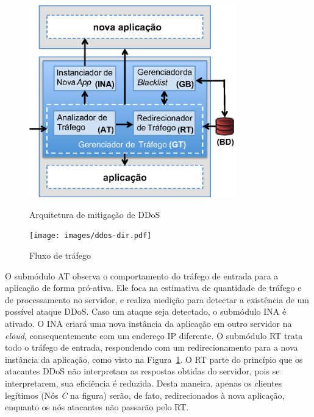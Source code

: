 \begin{figure}[t!]
  \centering
  \begin{minipage}[b]{0.59\linewidth}
    \centering
    \includegraphics[width=0.8\textwidth]{images/arq.eps}
	\caption{Arquitetura de mitigação de DDoS}
	\label{fig:arq}
  \end{minipage}
  \begin{minipage}[b]{0.4\linewidth}
    \centering
    \texttt{[image: images/ddos-dir.pdf]}
	\caption{Fluxo de tráfego}
	\label{fig:traf-ddos}
  \end{minipage}

\end{figure}



O submódulo AT observa o comportamento do tráfego de entrada para a aplicação de forma pró-ativa. Ele foca na estimativa de quantidade de tráfego e de processamento no servidor, e realiza medição para detectar a existência de um possível ataque DDoS. Caso um ataque seja detectado, o submódulo INA é ativado. O INA criará uma nova instância da aplicação em outro servidor na \emph{cloud}, consequentemente com um endereço IP diferente. %
O submódulo RT trata todo o tráfego de entrada, respondendo com um redirecionamento para a nova instância da aplicação, como visto na Figura~\ref{fig:traf-ddos}. O RT parte do princípio que os atacantes DDoS não interpretam as respostas obtidas do servidor, pois se interpretarem, sua eficiência é reduzida. Desta maneira, apenas os clientes legítimos (Nós \emph{C} na figura) serão, de fato, redirecionados à nova aplicação, enquanto os nós atacantes não passarão pelo RT.

